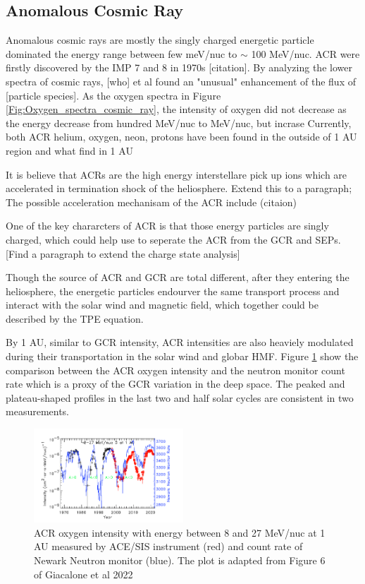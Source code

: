 \subsection{Anomalous Cosmic Ray}

Anomalous cosmic rays are mostly the singly charged energetic particle dominated the energy range between few meV/nuc to $\sim$ 100 MeV/nuc. \acs{ACR} were firstly discovered by the \acs{IMP} 7 and 8 in 1970s [citation]. By analyzing the lower spectra of cosmic rays, [who] et al found an "unusual" enhancement of the flux of [particle species]. As the oxygen spectra in Figure \ref{Fig:Oxygen_spectra_cosmic_ray}, the intensity of oxygen did not decrease as the energy decrease from hundred MeV/nuc to MeV/nuc, but incrase
Currently, both ACR helium, oxygen, neon, protons have been found in the outside of 1 AU region and what find in 1 AU

It is believe that ACRs are the high energy interstellare pick up ions which are accelerated in termination shock of the heliosphere. Extend this to a paragraph;
The possible acceleration mechanisam of the ACR include  (citaion)

One of the key chararcters of ACR is that those energy particles are singly charged, which could help use to seperate the ACR from the GCR and SEPs. [Find a paragraph to extend the charge state analysis]


Though the source of ACR and GCR are total different, after they entering the heliosphere, the energetic particles endourver the same transport process and interact with the solar wind and magnetic field,  which together could be described by the TPE equation.

By 1 AU, similar to GCR intensity, ACR intensities are also heaviely modulated during their transportation in the solar wind and globar \ac{HMF}. Figure \ref{Fig:ACR_solarmodulation} show the comparison between the ACR oxygen intensity and the neutron monitor count rate which is a proxy of the GCR variation in the deep space. The peaked and plateau-shaped profiles in the last two and half solar cycles are consistent in two measurements.


\begin{figure}
	\centering
	\includegraphics[width = 0.5\textwidth]{images/ACR_solarmodulation.png}
	\caption{ACR oxygen intensity with energy between 8 and 27 MeV/nuc at 1 AU measured by ACE/SIS instrument (red) and count rate of Newark Neutron monitor (blue). The plot is adapted from Figure 6 of Giacalone et al 2022}
	\label{Fig:ACR_solarmodulation}
\end{figure}

